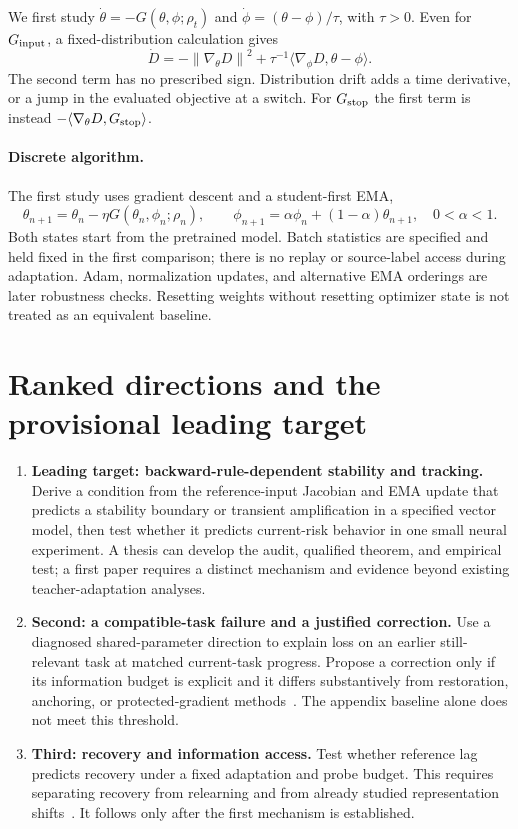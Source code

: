 \documentclass[11pt,a4paper]{article}
\newcommand{\norm}[1]{\left\lVert #1\right\rVert}
\begin{document}
We first study $\dot\theta=-G(\theta,\phi;\rho_t)$ and
$\dot\phi=(\theta-\phi)/\tau$, with $\tau>0$. Even for $G_{\rm input}$,
a fixed-distribution calculation gives
\begin{equation}
 \dot D=-\norm{\nabla_\theta D}^2
 +\tau^{-1}\langle\nabla_\phi D,\theta-\phi\rangle.
 \label{eq:energy}
\end{equation}
The second term has no prescribed sign. Distribution drift adds a time
derivative, or a jump in the evaluated objective at a switch. For
$G_{\rm stop}$ the first term is instead
$-\langle\nabla_\theta D,G_{\rm stop}\rangle$.

\paragraph{Discrete algorithm.}
The first study uses gradient descent and a student-first EMA,
\begin{equation}
 \theta_{n+1}=\theta_n-\eta G(\theta_n,\phi_n;\rho_n),\qquad
 \phi_{n+1}=\alpha\phi_n+(1-\alpha)\theta_{n+1},\quad 0<\alpha<1.
 \label{eq:discrete}
\end{equation}
Both states start from the pretrained model. Batch statistics are specified
and held fixed in the first comparison; there is no replay or source-label
access during adaptation. Adam, normalization updates, and alternative EMA
orderings are later robustness checks. Resetting weights without resetting
optimizer state is not treated as an equivalent baseline.

\section{Ranked directions and the provisional leading target}
\begin{enumerate}[leftmargin=*]
\item \textbf{Leading target: backward-rule-dependent stability and tracking.}
Derive a condition from the reference-input Jacobian and EMA update that
predicts a stability boundary or transient amplification in a specified
vector model, then test whether it predicts current-risk behavior in one
small neural experiment. A thesis can develop the audit, qualified theorem,
and empirical test; a first paper requires a distinct mechanism and
evidence beyond existing teacher-adaptation analyses.
\item \textbf{Second: a compatible-task failure and a justified correction.}
Use a diagnosed shared-parameter direction to explain loss on an earlier
still-relevant task at matched current-task progress. Propose a correction
only if its information budget is explicit and it differs substantively
from restoration, anchoring, or protected-gradient methods~\cite{ogd}.
The appendix baseline alone does not meet this threshold.
\item \textbf{Third: recovery and information access.}
Test whether reference lag predicts recovery under a fixed adaptation and
probe budget. This requires separating recovery from relearning and from
already studied representation shifts~\cite{spurious}. It follows only
after the first mechanism is established.
\end{enumerate}
\end{document}
